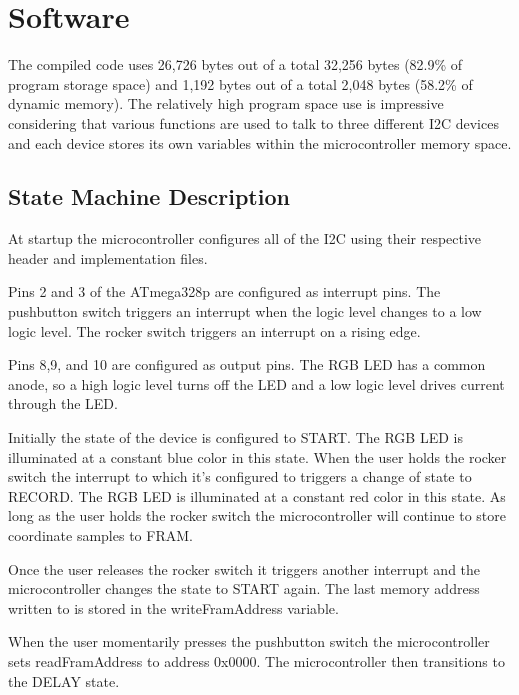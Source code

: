 \chapter{Software}

The compiled code uses 26,726 bytes out of a total 32,256 bytes (82.9\% of program storage space) and 1,192 bytes out of a total 2,048 bytes (58.2\% of dynamic memory).  The relatively high program space use is impressive considering that various functions are used to talk to three different I2C devices and each device stores its own variables within the microcontroller memory space.  

\section{State Machine Description}

At startup the microcontroller configures all of the I2C using their respective header and implementation files.

Pins 2 and 3 of the ATmega328p are configured as interrupt pins. The pushbutton switch triggers an interrupt when the logic level changes to a low logic level.  The rocker switch triggers an interrupt on a rising edge.

Pins 8,9, and 10 are configured as output pins.  The RGB LED has a common anode, so a high logic level turns off the LED and a low logic level drives current through the LED.

Initially the state of the device is configured to START.  The RGB LED is illuminated at a constant blue color in this state.  When the user holds the rocker switch the interrupt to which it's configured to triggers a change of state to RECORD.  The RGB LED is illuminated at a constant red color in this state.  As long as the user holds the rocker switch the microcontroller will continue to store coordinate samples to FRAM.

Once the user releases the rocker switch it triggers another interrupt and the microcontroller changes the state to START again.  The last memory address written to is stored in the writeFramAddress variable.

When the user momentarily presses the pushbutton switch the microcontroller sets readFramAddress to address 0x0000.  The microcontroller then transitions to the DELAY state.

